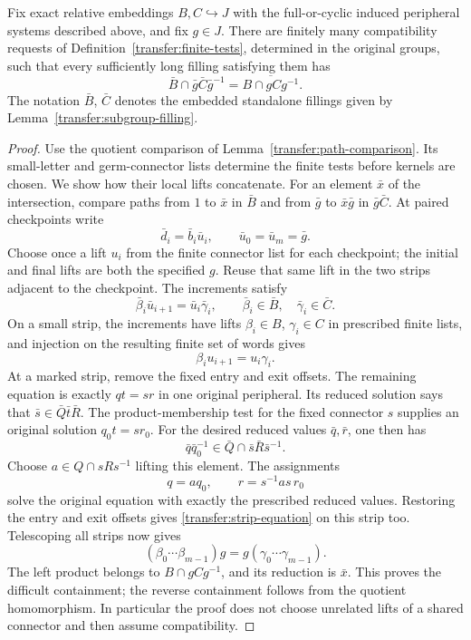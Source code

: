 \begin{proposition}\label{transfer:exact-intersection}
Fix exact relative embeddings \(B,C\hookrightarrow J\) with the full-or-cyclic induced peripheral systems described above, and fix \(g\in J\). There are finitely many compatibility requests of Definition~\ref{transfer:finite-tests}, determined in the original groups, such that every sufficiently long filling satisfying them has
\[
 \bar B\cap\bar g\bar C\bar g^{-1}
 =\overline{B\cap gCg^{-1}}.
\]
The notation \(\bar B\), \(\bar C\) denotes the embedded standalone fillings given by Lemma~\ref{transfer:subgroup-filling}.
\end{proposition}
\begin{proof}
Use the quotient comparison of Lemma~\ref{transfer:path-comparison}.
Its small-letter and germ-connector lists determine the finite tests
before kernels are chosen. We show how their local lifts concatenate.
For an element \(\bar x\) of the intersection, compare paths from \(1\) to \(\bar x\) in \(\bar B\) and from \(\bar g\) to \(\bar x\bar g\) in \(\bar g\bar C\). At paired checkpoints write
\[
 \bar d_i=\bar b_i\bar u_i,
 \qquad \bar u_0=\bar u_m=\bar g.
\]
Choose once a lift \(u_i\) from the finite connector list for each checkpoint; the initial and final lifts are both the specified \(g\). Reuse that same lift in the two strips adjacent to the checkpoint. The increments satisfy
\[
 \bar\beta_i\bar u_{i+1}=\bar u_i\bar\gamma_i,
 \qquad
 \bar\beta_i\in\bar B,\quad \bar\gamma_i\in\bar C.
\]
On a small strip, the increments have lifts \(\beta_i\in B\), \(\gamma_i\in C\) in prescribed finite lists, and injection on the resulting finite set of words gives
\begin{equation}\label{transfer:strip-equation}
 \beta_i u_{i+1}=u_i\gamma_i.
\end{equation}
At a marked strip, remove the fixed entry and exit offsets. The remaining equation is exactly \(qt=sr\) in one original peripheral. Its reduced solution says that \(\bar s\in\bar Q\bar t\bar R\). The product-membership test for the fixed connector \(s\) supplies an original solution \(q_0t=sr_0\). For the desired reduced values \(\bar q,\bar r\), one then has
\[
 \bar q\bar q_0^{-1}\in
 \bar Q\cap\bar s\bar R\bar s^{-1}.
\]
Choose \(a\in Q\cap sRs^{-1}\) lifting this element. The assignments
\[
 q=aq_0,\qquad r=s^{-1}as\,r_0
\]
solve the original equation with exactly the prescribed reduced values. Restoring the entry and exit offsets gives \eqref{transfer:strip-equation} on this strip too. Telescoping all strips now gives
\[
 (\beta_0\cdots\beta_{m-1})g
   =g(\gamma_0\cdots\gamma_{m-1}).
\]
The left product belongs to \(B\cap gCg^{-1}\), and its reduction is \(\bar x\). This proves the difficult containment; the reverse containment follows from the quotient homomorphism. In particular the proof does not choose unrelated lifts of a shared connector and then assume compatibility.
\end{proof}

